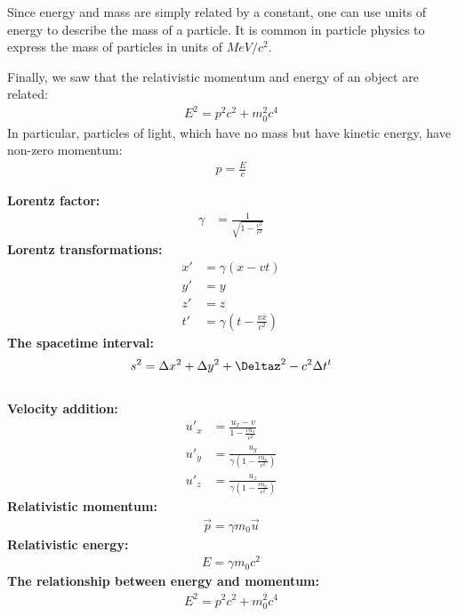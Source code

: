 \begin{chapterSummary}
Since energy and mass are simply related by a constant, one can use units of energy to describe the mass of a particle. It is common in particle physics to express the mass of particles in units of $\si{MeV/c^2}$.

Finally, we saw that the relativistic momentum and energy of an object are related:
\begin{align*}
E^2 = p^2c^2+m_0^2c^4
\end{align*}
In particular, particles of light, which have no mass but have kinetic energy, have non-zero momentum:
\begin{align*}
p=\frac{E}{c}
\end{align*}
\end{chapterSummary}

\newpage
\begin{importantEquations}
	\medskip
	\begin{multicols}{2}
		\textbf{Lorentz factor:}
		\begin{align*}
			\gamma &= \frac{1}{\sqrt{1-\frac{v^2}{c^2}}}
		\end{align*}
		\textbf{Lorentz transformations:}
		\begin{align*}
		x' &=\gamma (x-vt)\\
		y' &= y\\
		z' &= z\\
		t' &=\gamma\left(t-\frac{vx}{c^2} \right)
		\end{align*}
		\textbf{The spacetime interval:}
		\begin{align*}
		s^2 = \Delta x^2+\Delta y^2+\Deltaz^2-c^2\Delta t^t
		\end{align*}
		\columnbreak
		\\
		\textbf{Velocity addition:}
		\begin{align*}
			u'_x&=\frac{u_x -v}{1- \frac{vu_x}{c^2}}\\
			u'_y &=\frac{u_y}{\gamma\left(1- \frac{vu_x}{c^2}\right)}\\
			u'_z &=\frac{u_z}{\gamma\left(1- \frac{vu_x}{c^2}\right)}
		\end{align*}
		\textbf{Relativistic momentum:}
		\begin{align*}
			\vec p = \gamma m_0 \vec u
		\end{align*}
		\textbf{Relativistic energy:}
		\begin{align*}
			E = \gamma m_0 c^2
		\end{align*}
		\textbf{The relationship between energy and momentum:}
		\begin{align*}
			E^2 = p^2c^2 +m_0^2c^4
		\end{align*}
		\medskip
	\end{multicols}
\end{importantEquations}


